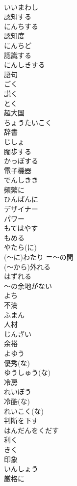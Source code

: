 \documentclass[8pt]{extreport}
\begin{document}
\begin{CJK}{UTF8}{min}
\\	いいまわし
\\	認知する	
\\	にんちする
\\	認知度	
\\	にんちど
\\	認識する	
\\	にんしきする
\\	語句	
\\	ごく
\\	説く	
\\	とく
\\	超大国	
\\	ちょうたいこく
\\	辞書	
\\	じしょ
\\	闊歩する	
\\	かっぽする
\\	電子機器	
\\	でんしきき
\\	頻繁に	
\\	ひんぱんに
\\	デザイナー	
\\	パワー	
\\	もてはやす	
\\	もめる	
\\	やたら(に)	
\\	(～に)わたり	＝～の間	
\\	(～から)外れる	
\\	はずれる
\\	～の余地がない	
\\	よち
\\	不満	
\\	ふまん
\\	人材	
\\	じんざい
\\	余裕	
\\	よゆう
\\	優秀(な)	
\\	ゆうしゅう(な)
\\	冷房	
\\	れいぼう
\\	冷酷(な)	
\\	れいこく(な)
\\	判断を下す	
\\	はんだんをくだす
\\	利く	
\\	きく
\\	印象	
\\	いんしょう
\\	厳格に	

\end{CJK}
\end{document}
